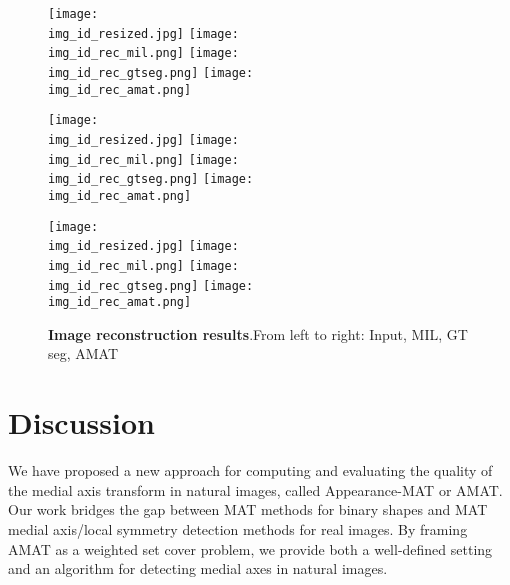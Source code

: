 \documentclass[10pt,twocolumn,letterpaper]{article}
\begin{document}
\begin{figure*}[t]
\centering
\def\imgw{0.24}

\def\img_id{145086}
\texttt{[image: \\img\_id\_resized.jpg]}
\texttt{[image: \\img\_id\_rec\_mil.png]}
\texttt{[image: \\img\_id\_rec\_gtseg.png]}
\texttt{[image: \\img\_id\_rec\_amat.png]}

\def\img_id{85048}
\texttt{[image: \\img\_id\_resized.jpg]}
\texttt{[image: \\img\_id\_rec\_mil.png]}
\texttt{[image: \\img\_id\_rec\_gtseg.png]}
\texttt{[image: \\img\_id\_rec\_amat.png]}

\def\img_id{42049}
\texttt{[image: \\img\_id\_resized.jpg]}
\texttt{[image: \\img\_id\_rec\_mil.png]}
\texttt{[image: \\img\_id\_rec\_gtseg.png]}
\texttt{[image: \\img\_id\_rec\_amat.png]}

\caption{\textbf{Image reconstruction results}.From left to right: Input, MIL, GT seg, AMAT}
\label{fig:experiments:reconstruction}
\end{figure*}



\section{Discussion}\label{sec:discussion}
We have proposed a new approach for computing and evaluating the quality of the medial axis transform in 
natural images, called Appearance-MAT or AMAT.
Our work bridges the gap between MAT methods for binary shapes and MAT medial axis/local symmetry detection methods
for real images.
By framing AMAT as a weighted set cover problem, we provide both a well-defined setting and an algorithm for 
detecting medial axes in natural images.


{\small


}
\end{document}
